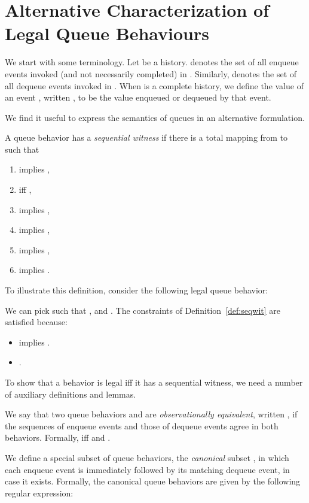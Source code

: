 \documentclass{LMCS}
\newcommand\mylabel[1]{\label{#1}}
\begin{document}
\section{Alternative Characterization of Legal Queue Behaviours}
\label{sec:seqwit}

We start with some terminology.
Let  be a history. 
 denotes the set of all enqueue events invoked (and not necessarily completed) in .
Similarly,  denotes the set of all dequeue events invoked in .
When  is a complete history, we define the value of an event , written , to be
the value enqueued or dequeued by that event.

We find it useful to express the semantics of queues in an alternative formulation.

\begin{defi}\mylabel{def:seqwit}
A queue behavior  has a {\em sequential witness} if there is a total mapping  from  to  such that
\begin{enumerate}[label=(\roman*)]
\item  implies , 
\item  iff ,
\item  implies ,
\item  implies ,
\item  implies ,
\item  implies .
\end{enumerate}
\end{defi}

\noindent To illustrate this definition, consider the following legal queue behavior:

We can pick  such that ,  and .
The constraints of Definition~\ref{def:seqwit} are satisfied because:
\begin{itemize}
\item  implies .
\item 
.
\end{itemize}

To show that a behavior is legal iff it has a sequential witness, we need a number of 
auxiliary definitions and lemmas.

We say that two queue behaviors  and  are {\em observationally equivalent}, written , 
if the sequences of enqueue events and those of dequeue events agree in both behaviors.
Formally,  iff  and .

We define a special subset of queue behaviors, the {\em canonical} subset , in which each enqueue event is immediately followed by its matching dequeue event, in case it exists.
Formally, the canonical queue behaviors are given by the following regular expression:
\end{document}
